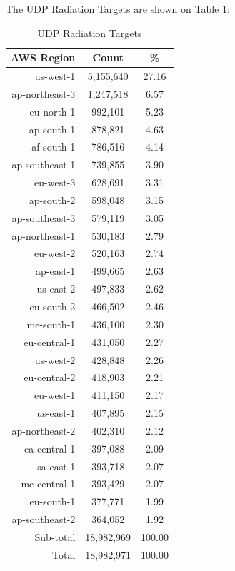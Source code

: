 \newpage
The UDP Radiation Targets are shown on Table \ref{tab:udpradiationtargets}:
\begin{table}[!h]
\begin{center}
\caption{UDP Radiation Targets}
\label{tab:udpradiationtargets}
\begin{tabular}{ |r|c|c| }
\hline
\centering AWS Region & Count & \%  \\
\hline
us-west-1 & 5,155,640 & 27.16  \\
ap-northeast-3 & 1,247,518 & 6.57  \\
eu-north-1 & 992,101 & 5.23  \\
ap-south-1 & 878,821 & 4.63  \\
af-south-1 & 786,516 & 4.14  \\
ap-southeast-1 & 739,855 & 3.90  \\
eu-west-3 & 628,691 & 3.31  \\
ap-south-2 & 598,048 & 3.15  \\
ap-southeast-3 & 579,119 & 3.05  \\
ap-northeast-1 & 530,183 & 2.79  \\
eu-west-2 & 520,163 & 2.74  \\
ap-east-1 & 499,665 & 2.63  \\
us-east-2 & 497,833 & 2.62  \\
eu-south-2 & 466,502 & 2.46  \\
me-south-1 & 436,100 & 2.30  \\
eu-central-1 & 431,050 & 2.27  \\
us-west-2 & 428,848 & 2.26  \\
eu-central-2 & 418,903 & 2.21  \\
eu-west-1 & 411,150 & 2.17  \\
us-east-1 & 407,895 & 2.15  \\
ap-northeast-2 & 402,310 & 2.12  \\
ca-central-1 & 397,088 & 2.09  \\
sa-east-1 & 393,718 & 2.07  \\
me-central-1 & 393,429 & 2.07  \\
eu-south-1 & 377,771 & 1.99  \\
ap-southeast-2 & 364,052 & 1.92  \\
\hline
Sub-total & 18,982,969 & 100.00  \\
\hline
Total & 18,982,971 & 100.00  \\
\hline
\end{tabular}
\end{center}
\end{table}


